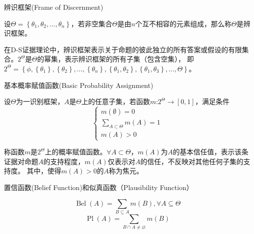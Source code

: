 \begin{definition}
辨识框架(Frame of Discernment)
\end{definition}
设$\Theta=\left\{\theta_{1}, \theta_{2}, \ldots, \theta_{n}\right\}$，若非空集合$\Theta$是由$n$个互不相容的元素组成，那么称$\Theta$是辨识框架。

在D-S证据理论中，辨识框架表示关于命题的彼此独立的所有答案或假设的有限集合\cite{refs80}。$2^\Theta$是$\Theta$的幂集，表示辨识框架的所有子集（包含空集），
即$2^{\Theta}=\left\{\phi,\left\{\theta_{1}\right\},\left\{\theta_{2}\right\}, \ldots,\left\{\theta_{n}\right\},\left\{\theta_{1}, \theta_{2}\right\},\left\{\theta_{1}, \theta_{3}\right\}, \ldots, \Theta\right\}$。

\begin{definition}
基本概率赋值函数(Basic Probability Assignment)
\end{definition}
设$\Theta$为一识别框架，$A$是$\Theta$上的任意子集，若函数$m$:$2^{\Theta} \rightarrow[0,1]$，满足条件
\begin{equation}
\left\{\begin{array}{l}{m(\emptyset)=0} \\ {\sum_{A \subset \Theta} m(A)=1} \\ {m(A)>0}\end{array}\right.
\end{equation}

称函数$m$是$2^\Theta$上的概率赋值函数。$\forall A \subset \Theta$，$m(A)$为$A$的基本信任值，表示该条证据对命题$A$的支持程度，$m(A)$仅表示对$A$的信任，不反映对其他任何子集的支持度。
其中，使得$m(A)>0$的$A$称为焦元。
\begin{definition}
置信函数(Belief Function)和似真函数（Plausibility Function）
\end{definition}
\begin{equation}
  \operatorname{Bel}(A)=\sum_{B \subseteq A} m(B), \forall A \subseteq \Theta
\end{equation}
\begin{equation}
  \operatorname{Pl}(A)=\sum_{B \cap A \neq \varnothing} m(B)
\end{equation}

